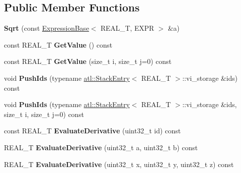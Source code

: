 \subsection*{Public Member Functions}
\begin{DoxyCompactItemize}
\item 
\hypertarget{structatl_1_1_sqrt_ac8e3a110ca40bdf839670082dc5e4ef0}{{\bfseries Sqrt} (const \hyperlink{structatl_1_1_expression_base}{Expression\+Base}$<$ R\+E\+A\+L\+\_\+\+T, E\+X\+P\+R $>$ \&a)}\label{structatl_1_1_sqrt_ac8e3a110ca40bdf839670082dc5e4ef0}

\item 
\hypertarget{structatl_1_1_sqrt_a6c0d48a0e6e86b70b7514b750fcb30be}{const R\+E\+A\+L\+\_\+\+T {\bfseries Get\+Value} () const }\label{structatl_1_1_sqrt_a6c0d48a0e6e86b70b7514b750fcb30be}

\item 
\hypertarget{structatl_1_1_sqrt_a3b8ddd52b949a35e968943d3061895d8}{const R\+E\+A\+L\+\_\+\+T {\bfseries Get\+Value} (size\+\_\+t i, size\+\_\+t j=0) const }\label{structatl_1_1_sqrt_a3b8ddd52b949a35e968943d3061895d8}

\item 
\hypertarget{structatl_1_1_sqrt_a6b88eb004324b1c5ce917b240964b84b}{void {\bfseries Push\+Ids} (typename \hyperlink{structatl_1_1_stack_entry}{atl\+::\+Stack\+Entry}$<$ R\+E\+A\+L\+\_\+\+T $>$\+::vi\+\_\+storage \&ids) const }\label{structatl_1_1_sqrt_a6b88eb004324b1c5ce917b240964b84b}

\item 
\hypertarget{structatl_1_1_sqrt_a5aa440d7850741d3f82e4c82156bdc57}{void {\bfseries Push\+Ids} (typename \hyperlink{structatl_1_1_stack_entry}{atl\+::\+Stack\+Entry}$<$ R\+E\+A\+L\+\_\+\+T $>$\+::vi\+\_\+storage \&ids, size\+\_\+t i, size\+\_\+t j=0) const }\label{structatl_1_1_sqrt_a5aa440d7850741d3f82e4c82156bdc57}

\item 
\hypertarget{structatl_1_1_sqrt_a2f172626c37c28171e634ba3eeba348f}{const R\+E\+A\+L\+\_\+\+T {\bfseries Evaluate\+Derivative} (uint32\+\_\+t id) const }\label{structatl_1_1_sqrt_a2f172626c37c28171e634ba3eeba348f}

\item 
\hypertarget{structatl_1_1_sqrt_a0557e6c7ac21f2fe378119fd68a52bdd}{R\+E\+A\+L\+\_\+\+T {\bfseries Evaluate\+Derivative} (uint32\+\_\+t a, uint32\+\_\+t b) const }\label{structatl_1_1_sqrt_a0557e6c7ac21f2fe378119fd68a52bdd}

\item 
\hypertarget{structatl_1_1_sqrt_ab6c9c3321b4f641ea4059c9c26308238}{R\+E\+A\+L\+\_\+\+T {\bfseries Evaluate\+Derivative} (uint32\+\_\+t x, uint32\+\_\+t y, uint32\+\_\+t z) const }\label{structatl_1_1_sqrt_ab6c9c3321b4f641ea4059c9c26308238}


\end{DoxyCompactItemize}

